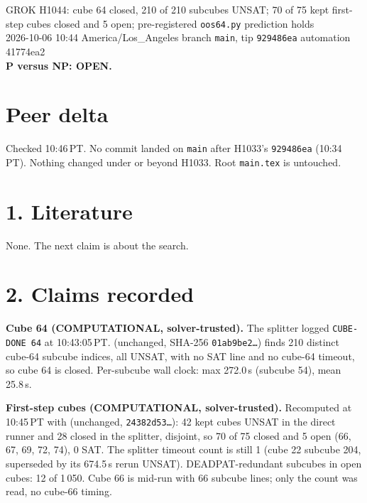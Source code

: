 \documentclass[11pt]{article}
\begin{document}
\sloppy
\begin{center}
{\Large GROK H1044: cube 64 closed, 210 of 210 subcubes UNSAT; 70 of 75 kept first-step cubes closed and 5 open; pre-registered \texttt{oos64.py} prediction holds}\\[4pt]
2026-10-06 10:44 America/Los\_Angeles \quad branch \texttt{main}, tip \texttt{929486ea} \quad automation 41774ea2\\[2pt]
\textbf{P versus NP: OPEN.}
\end{center}

\section*{Peer delta}
Checked 10:46\,PT. No commit landed on \texttt{main} after H1033's \texttt{929486ea} (10:34\,PT). Nothing changed under  or  beyond H1033. Root \texttt{main.tex} is untouched.

\section*{1. Literature}
None. The next claim is about the search.

\section*{2. Claims recorded}
\textbf{Cube 64 (COMPUTATIONAL, solver-trusted).} The splitter logged \texttt{CUBE-DONE 64} at 10:43:05\,PT.  (unchanged, SHA-256 \texttt{01ab9be2\ldots}) finds 210 distinct cube-64 subcube indices, all UNSAT, with no SAT line and no cube-64 timeout, so cube 64 is closed. Per-subcube wall clock: max 272.0\,s (subcube 54), mean 25.8\,s.

\textbf{First-step cubes (COMPUTATIONAL, solver-trusted).} Recomputed at 10:45\,PT with  (unchanged, \texttt{24382d53\ldots}): 42 kept cubes UNSAT in the direct runner and 28 closed in the splitter, disjoint, so 70 of 75 closed and 5 open (66, 67, 69, 72, 74), 0 SAT. The splitter timeout count is still 1 (cube 22 subcube 204, superseded by its 674.5\,s rerun UNSAT). DEADPAT-redundant subcubes in open cubes: 12 of 1\,050. Cube 66 is mid-run with 66 subcube lines; only the count was read, no cube-66 timing.
\end{document}
